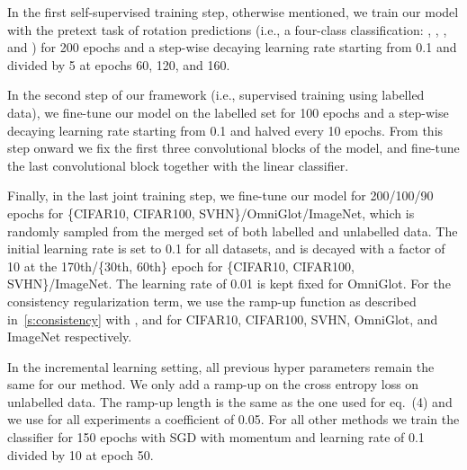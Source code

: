 In the first self-supervised training step,  otherwise mentioned, we train our model with the pretext task of rotation predictions (i.e., a four-class classification: , , , and ) for 200 epochs and a step-wise decaying learning rate starting from 0.1 and divided by 5 at epochs 60, 120, and 160.

In the second step of our framework (i.e., supervised training using labelled data), we fine-tune our model on the labelled set for 100 epochs and a step-wise decaying learning rate starting from 0.1 and halved every 10 epochs.
From this step onward we fix the first three convolutional blocks of the model, and fine-tune the last convolutional block together with the linear classifier.

Finally, in the last joint training step, we fine-tune our model for 200/100/90 epochs for \{CIFAR10, CIFAR100, SVHN\}/OmniGlot/ImageNet, which is randomly sampled from the merged set of both labelled and unlabelled data.
The initial learning rate is set to 0.1 for all datasets, and is decayed with a factor of 10 at the 170th/\{30th, 60th\} epoch for \{CIFAR10, CIFAR100, SVHN\}/ImageNet.
The learning rate of 0.01 is kept fixed for OmniGlot.
For the consistency regularization term, we use the ramp-up function as described in~\cref{s:consistency} with , and  for CIFAR10, CIFAR100, SVHN, OmniGlot, and ImageNet respectively.

In the incremental learning setting, all previous hyper parameters remain the same for our method.
We only add a ramp-up on the cross entropy loss on unlabelled data.
The ramp-up length is the same as the one used for eq.~(4) and we use for all experiments a coefficient of 0.05.
For all other methods we train the classifier for 150 epochs with SGD with momentum and learning rate of 0.1 divided by 10 at epoch 50.


